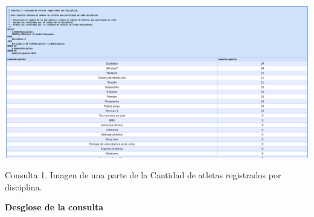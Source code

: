 \begin{center}
    \includegraphics[width=16.5cm]{resources/Chapters/Consultas/Imagenes/Consulta1.jpeg} 
    
   Consulta 1. Imagen de una parte de la Cantidad de atletas registrados por disciplina.
\end{center}

\textbf{Desglose de la consulta}


